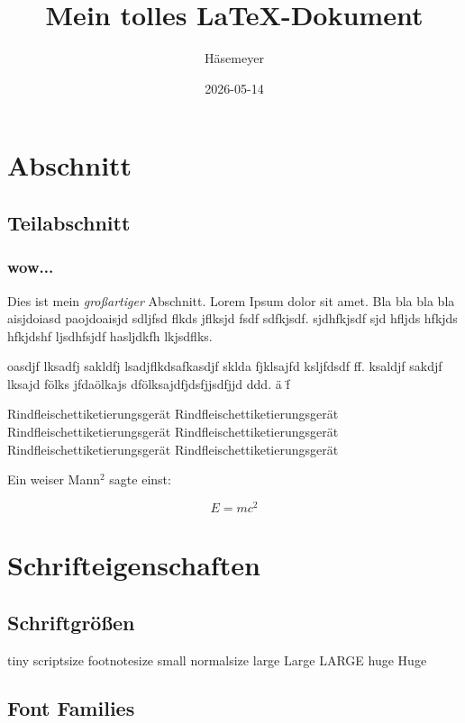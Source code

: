 \documentclass{article}
\title{Mein tolles \LaTeX-Dokument}
\author{Häsemeyer}
\date{2026-05-14}
\begin{document}
\maketitle
\tableofcontents
\newpage

\section{Abschnitt}

\subsection{Teilabschnitt}

\subsubsection{wow...}

Dies ist mein {\em großartiger} Abschnitt. Lorem Ipsum dolor sit amet.
Bla bla bla bla aisjdoiasd paojdoaisjd sdljfsd flkds jflksjd fsdf sdfkjsdf.
sjdhfkjsdf sjd hfljds hfkjds hfkjdshf ljsdhfsjdf hasljdkfh lkjsdflks.

oasdjf lksadfj sakldfj lsadjflkdsafkasdjf sklda fjklsajfd ksljfdsdf ff.
ksaldjf sakdjf lksajd fölks jfdaölkajs dfölksajdfjdsfjjsdfjjd ddd. \"a \"f %

Rindfleischettiketierungsgerät Rindfleischettiketierungsgerät Rindfleischettiketierungsgerät Rindfleischettiketierungsgerät Rindfleischettiketierungsgerät Rindfleischettiketierungsgerät

Ein weiser Mann$^2$ sagte einst:

\[ E=mc^2 \]

\section{Schrifteigenschaften}

\subsection{Schriftgrößen}

{\tiny tiny}
{\scriptsize scriptsize}
{\footnotesize footnotesize}
{\small small}
{\normalsize normalsize}
{\large large}
{\Large Large}
{\LARGE LARGE}
{\huge huge}
{\Huge Huge}

\subsection{Font Families}
\end{document}
